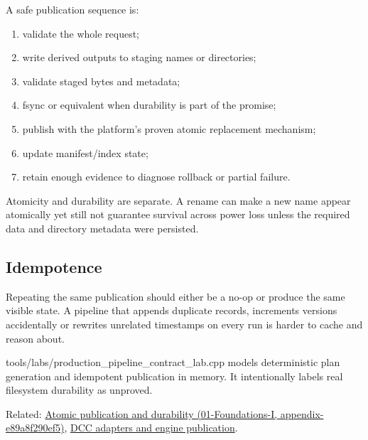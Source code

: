 A safe publication sequence is:

\begin{enumerate}
\def\labelenumi{\arabic{enumi}.}
\tightlist
\item
  validate the whole request;
\item
  write derived outputs to staging names or directories;
\item
  validate staged bytes and metadata;
\item
  fsync or equivalent when durability is part of the promise;
\item
  publish with the platform's proven atomic replacement mechanism;
\item
  update manifest/index state;
\item
  retain enough evidence to diagnose rollback or partial failure.
\end{enumerate}

Atomicity and durability are separate. A rename can make a new name appear atomically yet still not guarantee survival across power loss unless the required data and directory metadata were persisted.

\subsection{Idempotence}\label{idempotence}

Repeating the same publication should either be a no-op or produce the same visible state. A pipeline that appends duplicate records, increments versions accidentally or rewrites unrelated timestamps on every run is harder to cache and reason about.

tools/labs/production\_pipeline\_contract\_lab.cpp models deterministic plan generation and idempotent publication in memory. It intentionally labels real filesystem durability as unproved.

Related: \href{}{Atomic publication and durability (01-Foundations-I, appendix-e89a8f290ef5)}, \hyperref[appendix-03ade9e1875f]{DCC adapters and engine publication}.
